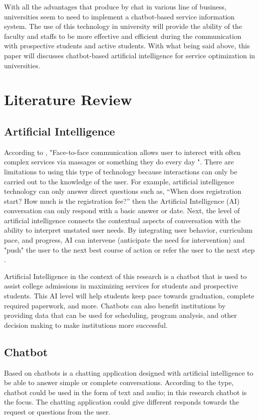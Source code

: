 \documentclass[conference]{IEEEtran}
\begin{document}
With all the advantages that produce by chat in various line of business, universities seem to need to implement a chatbot-based service information system. The use of this technology in university will provide the ability of the faculty and staffs to be more effective and efficient during the communication with prospective students and active students. With what being said above, this paper will discusses chatbot-based artificial intelligence for service optimization in universities.

\section{Literature Review}
\subsection{Artificial Intelligence}
According to \cite{b13}, "Face-to-face communication allows user to interect with often complex services via massages or something they do every day ". There are limitations to using this type of technology because interactions can only be carried out to the knowledge of the user. For example, artificial intelligence technology can only answer direct questions such as, “When does registration start? How much is the registration fee?” then the Artificial Intelligence (AI) conversation can only respond with a basic answer or date.
Next, the level of artificial intelligence connects the contextual aspects of conversation with the ability to interpret unstated user needs. By integrating user behavior, curriculum pace, and progress, AI can intervene (anticipate the need for intervention) and "push" the user to the next best course of action or refer the user to the next step \cite{b14}.

Artificial Intelligence in the context of this research is a chatbot that is used to assist college admissions in maximizing services for students and prospective students. This AI level will help students keep pace towards graduation, complete required paperwork, and more. Chatbots can also benefit institutions by providing data that can be used for scheduling, program analysis, and other decision making to make institutions more successful.

\subsection{Chatbot}
Based on \cite{b15} chatbots is a chatting application designed with artificial intelligence to be able to answer simple or complete conversations. According to the type, chatbot could be used in the form of text and audio; in this research chatbot is the focus. The chatting application could give different responds towards the request or questions from the user. \cite{b16}
\end{document}

